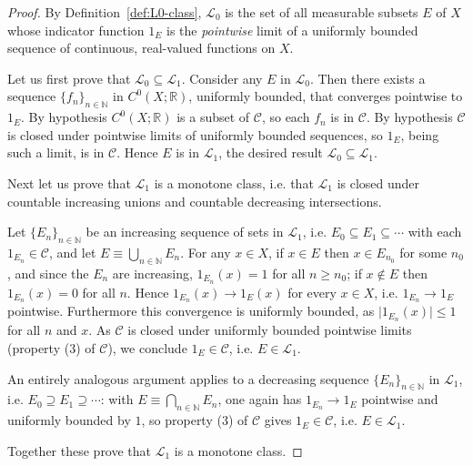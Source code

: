 \begin{proof}
    \leanok
By Definition~\ref{def:L0-class}, $\mathcal{L}_0$ is the set of all measurable subsets $E$ of $X$ whose indicator function $1_E$ is the \textit{pointwise} limit of a uniformly bounded sequence of continuous, real-valued functions on $X$.

Let us first prove that $\mathcal{L}_0 \subseteq \mathcal{L}_1$. Consider any $E$ in $\mathcal{L}_0$. Then there exists a sequence $\{ f_n \}_{n \in \mathbb{N}}$ in $C^0(X; \mathbb{R})$, uniformly bounded, that converges pointwise to $1_E$. By hypothesis $C^0(X; \mathbb{R})$ is a subset of $\mathcal{C}$, so each $f_n$ is in $\mathcal{C}$. By hypothesis $\mathcal{C}$ is closed under pointwise limits of uniformly bounded sequences, so $1_E$, being such a limit, is in $\mathcal{C}$. Hence $E$ is in $\mathcal{L}_1$, the desired result $\mathcal{L}_0 \subseteq \mathcal{L}_1$.

Next let us prove that $\mathcal{L}_1$ is a monotone class, i.e. that $\mathcal{L}_1$ is closed under countable increasing unions and countable decreasing intersections.

Let $\{ E_n \}_{n \in \mathbb{N}}$ be an increasing sequence of sets in $\mathcal{L}_1$, i.e. $E_0 \subseteq E_1 \subseteq \cdots$ with each $1_{E_n} \in \mathcal{C}$, and let $E \equiv \bigcup_{n \in \mathbb{N}} E_n$. For any $x \in X$, if $x \in E$ then $x \in E_{n_0}$ for some $n_0$, and since the $E_n$ are increasing, $1_{E_n}(x) = 1$ for all $n \ge n_0$; if $x \notin E$ then $1_{E_n}(x) = 0$ for all $n$. Hence $1_{E_n}(x) \rightarrow 1_E(x)$ for every $x \in X$, i.e. $1_{E_n} \rightarrow 1_E$ pointwise. Furthermore this convergence is uniformly bounded, as $\lvert 1_{E_n}(x) \rvert \le 1$ for all $n$ and $x$. As $\mathcal{C}$ is closed under uniformly bounded pointwise limits (property (3) of $\mathcal{C}$), we conclude $1_E \in \mathcal{C}$, i.e. $E \in \mathcal{L}_1$.

An entirely analogous argument applies to a decreasing sequence $\{ E_n \}_{n \in \mathbb{N}}$ in $\mathcal{L}_1$, i.e. $E_0 \supseteq E_1 \supseteq \cdots$: with $E \equiv \bigcap_{n \in \mathbb{N}} E_n$, one again has $1_{E_n} \rightarrow 1_E$ pointwise and uniformly bounded by $1$, so property (3) of $\mathcal{C}$ gives $1_E \in \mathcal{C}$, i.e. $E \in \mathcal{L}_1$.

Together these prove that $\mathcal{L}_1$ is a monotone class.


\end{proof}
